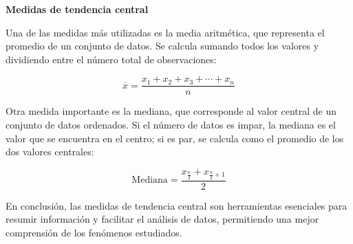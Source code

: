 
\begin{center}
{\LARGE \textbf{Medidas de tendencia central}}
\end{center}

\noindent
Una de las medidas más utilizadas es la media aritmética, que representa el promedio de un conjunto de datos. 
Se calcula sumando todos los valores y dividiendo entre el número total de observaciones:

\vspace{0.3cm}

\[
\overline{x} = \frac{x_1 + x_2 + x_3 + \cdots + x_n}{n}
\]
 
\vspace{0.3cm}

\noindent
Otra medida importante es la mediana, que corresponde al valor central de un conjunto de datos ordenados. Si el número de datos es impar, la mediana es el valor que se encuentra en el centro; si es par, se calcula como el promedio de los dos valores centrales:

\vspace{0.3cm}


\[
\text{Mediana} = \frac{x_{\frac{n}{2}} + x_{\frac{n}{2}+1}}{2}
\]

\vspace{0.3cm}

\noindent
En conclusión, las medidas de tendencia central son herramientas esenciales para resumir información y facilitar el análisis de datos, permitiendo una mejor comprensión de los fenómenos estudiados.

